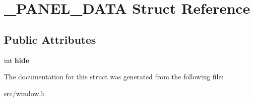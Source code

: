 \hypertarget{struct__PANEL__DATA}{\section{\-\_\-\-P\-A\-N\-E\-L\-\_\-\-D\-A\-T\-A Struct Reference}
\label{struct__PANEL__DATA}
}
\subsection*{Public Attributes}
\begin{DoxyCompactItemize}
\item 
\hypertarget{struct__PANEL__DATA_a462fbda39cf0de1a64f7116fd7342463}{int {\bfseries hide}}\label{struct__PANEL__DATA_a462fbda39cf0de1a64f7116fd7342463}

\end{DoxyCompactItemize}


The documentation for this struct was generated from the following file\-:\begin{DoxyCompactItemize}
\item 
src/window.\-h\end{DoxyCompactItemize}

